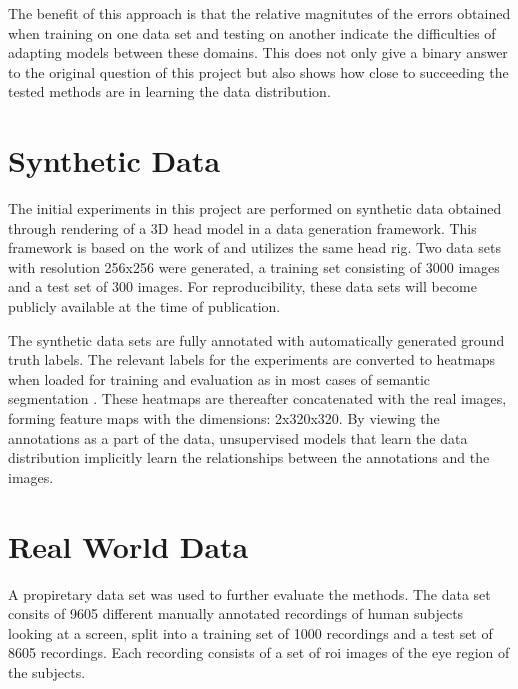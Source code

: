 The benefit of this approach is that the relative magnitutes of the errors obtained when training on one data set and testing on another indicate the difficulties of adapting models between these domains. This does not only give a binary answer to the original question of this project but also shows how close to succeeding the tested methods are in learning the data distribution. %


\section{Synthetic Data}
The initial experiments in this project are performed on synthetic data obtained through rendering of a 3D head model in a data generation framework. This framework is based on the work of \textcite{swirski2014rendering} and utilizes the same head rig. Two data sets with resolution 256x256 were generated, a training set consisting of 3000 images and a test set of 300 images. For reproducibility, these data sets will become publicly available at the time of publication.

The synthetic data sets are fully annotated with automatically generated ground truth labels. The relevant labels for the experiments are converted to heatmaps when loaded for training and evaluation as in most cases of semantic segmentation \parencite{guo2017review}. These heatmaps are thereafter concatenated with the real images, forming feature maps with the dimensions: 2x320x320. By viewing the annotations as a part of the data, unsupervised models that learn the data distribution implicitly learn the relationships between the annotations and the images.

\section{Real World Data}
A propiretary data set was used to further evaluate the methods. The data set consits of 9605 different manually annotated recordings of human subjects looking at a screen, split into a training set of 1000 recordings and a test set of 8605 recordings. Each recording consists of a set of \acrfull{roi} images of the eye region of the subjects. 

